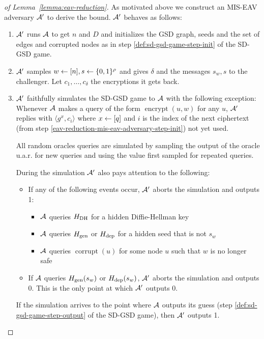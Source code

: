 \begin{proof}[of Lemma~\ref{lemma:eav-reduction}]
	As motivated above we construct an MIS-EAV adversary $\mathcal{A}'$ to derive the bound. $\mathcal{A}'$ behaves as follows:
	\begin{enumerate}[1.]
		\item $\mathcal{A}'$ runs $\mathcal{A}$ to get $n$ and $D$ and initializes the GSD graph, seeds and the set of edges and corrupted nodes as in step \ref{def:sd-gsd-game-step-init} of the SD-GSD game.
		\item \label{eav-reduction-mis-eav-adversary-step-init} $\mathcal{A}'$ samples $w \leftarrow [n], s \leftarrow \{0, 1\}^\rho$ and gives $\delta$ and the messages $s_w, s$ to the challenger. Let $c_1, \ldots, c_\delta$ the encryptions it gets back.
		\item $\mathcal{A}'$ faithfully simulates the SD-GSD game to $\mathcal{A}$ with the following exception: Whenever $\mathcal{A}$ makes a query of the form $\operatorname{encrypt}(u, w)$ for any $u$, $\mathcal{A}'$ replies with $\langle g^x, c_i \rangle$ where $x \leftarrow [q]$ and $i$ is the index of the next ciphertext (from step \ref{eav-reduction-mis-eav-adversary-step-init}) not yet used.

		      All random oracles queries are simulated by sampling the output of the oracle u.a.r. for new queries and using the value first sampled for repeated queries.

		      During the simulation $\mathcal{A}'$ also pays attention to the following:
		      \begin{itemize}
			      \item If any of the following events occur, $\mathcal{A}'$ aborts the simulation and outputs 1:
			            \begin{itemize}
				            \item $\mathcal{A}$ queries $H_\mathrm{DH}$ for a hidden Diffie-Hellman key
				            \item $\mathcal{A}$ queries $H_\mathrm{gen}$ or $H_\mathrm{dep}$ for a hidden seed that is not $s_w$
				            \item $\mathcal{A}$ queries $\operatorname{corrupt}(u)$ for some node $u$ such that $w$ is no longer safe
			            \end{itemize}
			      \item If $\mathcal{A}$ queries $H_\mathrm{gen}(s_w)$ or $H_\mathrm{dep}(s_w)$, $\mathcal{A}'$ aborts the simulation and outputs 0. This is the only point at which $\mathcal{A}'$ outputs 0.
		      \end{itemize}

		      If the simulation arrives to the point where $\mathcal{A}$ outputs its guess (step \ref{def:sd-gsd-game-step-output} of the SD-GSD game), then $\mathcal{A}'$ outputs 1.
	\end{enumerate}


\end{proof}
